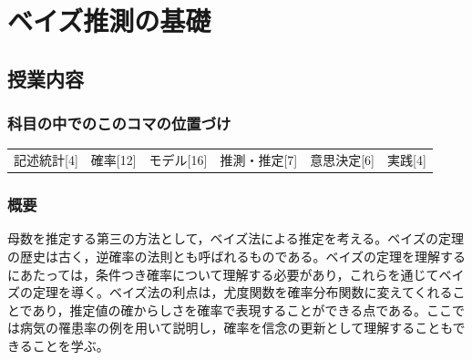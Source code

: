 \section{ベイズ推測の基礎}
\label{lesson25}
\subsection{授業内容}
\subsubsection{科目の中でのこのコマの位置づけ}
\begin{tabular}[t]{cccccc}
    記述統計[4] & 確率[12] & モデル[16] & 推測・推定[7] & 意思決定[6] & 実践[4]
\end{tabular}
\subsubsection{概要}
母数を推定する第三の方法として，ベイズ法による推定を考える。ベイズの定理の歴史は古く，逆確率の法則とも呼ばれるものである。ベイズの定理を理解するにあたっては，条件つき確率について理解する必要があり，これらを通じてベイズの定理を導く。ベイズ法の利点は，尤度関数を確率分布関数に変えてくれることであり，推定値の確からしさを確率で表現することができる点である。ここでは病気の罹患率の例を用いて説明し，確率を信念の更新として理解することもできることを学ぶ。

